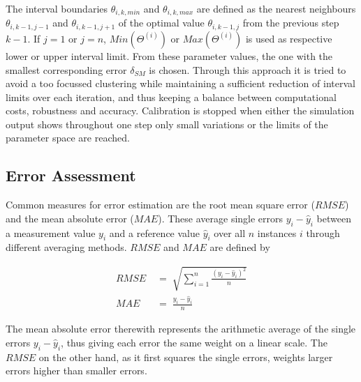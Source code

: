 \noindent The interval boundaries $\theta_{i,k,min}$ and $\theta_{i,k,max}$ are defined as the nearest neighbours $\theta_{i,k-1,j-1}$ and $\theta_{i,k-1,j+1}$ of the optimal value $\theta_{i,k-1,j}$ from the previous step $k-1$. If $j=1$ or $j=n$, $Min(\Theta^{(i)})$ or $Max(\Theta^{(i)})$ is used as respective lower or upper interval limit. From these parameter values, the one with the smallest corresponding error $\delta_{SM}$ is chosen. Through this approach it is tried to avoid a too focussed clustering while maintaining a sufficient reduction of interval limits over each iteration, and thus keeping a balance between computational costs, robustness and accuracy. Calibration is stopped when either the simulation output shows throughout one step only small variations or the limits of the parameter space are reached.

\subsection{Error Assessment}
\label{Sec-SubMethErrAss}

Common measures for error estimation are the root mean square error ($RMSE$) and the mean absolute error ($MAE$). These average single errors $y_i - \hat{y}_i$ between a measurement value $y_i$ and a reference value $\hat{y}_i$ over all $n$ instances $i$ through different averaging methods. $RMSE$ and $MAE$ are defined by

\begin{align}
    RMSE \; & = \; \sqrt{ \sum_{i=1}^{n} \frac{(y_i - \hat{y}_i)^2}{n} } \label{Eq-RMSE}\\
    MAE \; & = \; \frac{y_i - \hat{y}_i }{n} \label{MAE}
\end{align}


\noindent The mean absolute error therewith represents the arithmetic average of the single errors $y_i-\hat{y}_i$, thus giving each error the same weight on a linear scale. The $RMSE$ on the other hand, as it first squares the single errors, weights larger errors higher than smaller errors.

